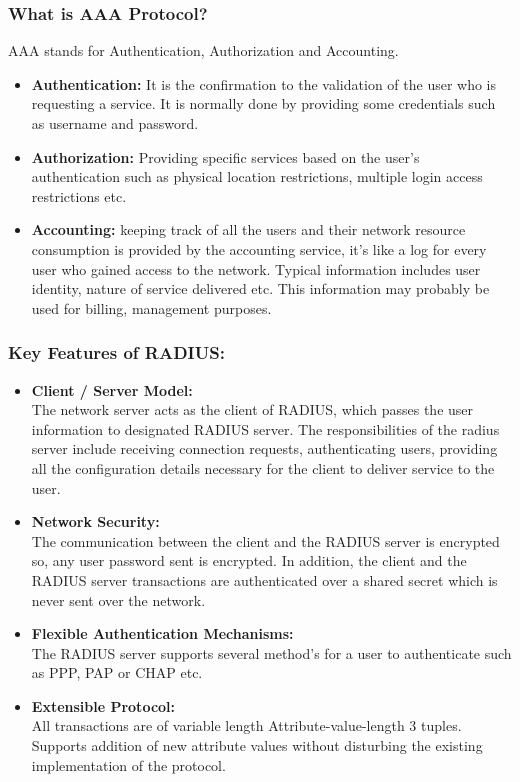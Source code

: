\subsubsection{What is AAA Protocol? \cite{RADIUS_AAA}} \label{RADIUS_AAA}
AAA stands for Authentication, Authorization and Accounting.
\begin{itemize}
	\item \textbf{Authentication:} It is the confirmation to the validation of the user who is requesting a service. It is normally done by providing some credentials such as username and password.
	\item \textbf{Authorization:} Providing specific services based on the user’s authentication such as physical location restrictions, multiple login access restrictions etc.
	\item \textbf{Accounting:} keeping track of all the users and their network resource consumption is provided by the accounting service, it’s like a log for every user who gained access to the network. Typical information includes user identity, nature of service delivered etc. This information may probably be used for billing, management purposes.
	
\end{itemize}
\subsubsection{Key Features of RADIUS: \cite{RADIUS_RFC2865}} \label{RADIUS_features}
\begin{itemize}
	\item \textbf{Client / Server Model:} 
	\\	The network server acts as the client of RADIUS, which passes the user information to designated RADIUS server. The responsibilities of the radius server include receiving connection requests, authenticating users, providing all the configuration details necessary for the client to deliver service to the user.
	\item \textbf{Network Security:}
	\\ The communication between the client and the RADIUS server is encrypted so, any user password sent is encrypted. In addition, the client and the RADIUS server transactions are authenticated over a shared secret which is never sent over the network.
	\item \textbf{Flexible Authentication Mechanisms:}
	\\ The RADIUS server supports several method’s for a user to authenticate such as PPP, PAP or CHAP etc.
	\item \textbf{Extensible Protocol:}
	\\ All transactions are of variable length Attribute-value-length 3 tuples. Supports addition of new attribute values without disturbing the existing implementation of the protocol.
	
\end{itemize}

